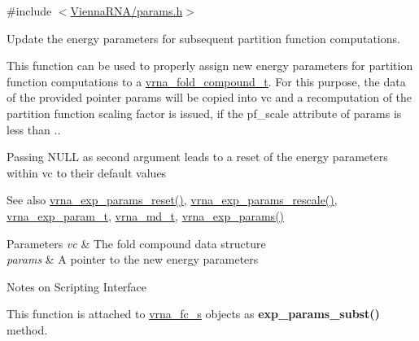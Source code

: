 {\ttfamily \#include $<$\hyperlink{params_8h}{Vienna\+R\+N\+A/params.\+h}$>$}



Update the energy parameters for subsequent partition function computations. 

This function can be used to properly assign new energy parameters for partition function computations to a \hyperlink{group__fold__compound_ga1b0cef17fd40466cef5968eaeeff6166}{vrna\+\_\+fold\+\_\+compound\+\_\+t}. For this purpose, the data of the provided pointer {\ttfamily params} will be copied into {\ttfamily vc} and a recomputation of the partition function scaling factor is issued, if the {\ttfamily pf\+\_\+scale} attribute of {\ttfamily params} is less than {.}.

Passing N\+U\+LL as second argument leads to a reset of the energy parameters within vc to their default values

\begin{DoxySeeAlso}{See also}
\hyperlink{group__energy__parameters_gaa5409218068be84d7b50c78fbdaa85a9}{vrna\+\_\+exp\+\_\+params\+\_\+reset()}, \hyperlink{group__energy__parameters_gad607bc3a5b5da16400e2ca4ea5560233}{vrna\+\_\+exp\+\_\+params\+\_\+rescale()}, \hyperlink{group__energy__parameters_ga01d8b92fe734df8d79a6169482c7d8d8}{vrna\+\_\+exp\+\_\+param\+\_\+t}, \hyperlink{group__model__details_ga1f8a10e12a0a1915f2a4eff0b28ea17c}{vrna\+\_\+md\+\_\+t}, \hyperlink{group__energy__parameters_gab1f3016f96aa96bff020cdd904605afa}{vrna\+\_\+exp\+\_\+params()}
\end{DoxySeeAlso}

\begin{DoxyParams}{Parameters}
{\em vc} & The fold compound data structure \\
\hline
{\em params} & A pointer to the new energy parameters\\
\hline
\end{DoxyParams}
\begin{DoxyRefDesc}{Notes on Scripting Interface}
\item[\hyperlink{scripting__scripting000004}{Notes on Scripting Interface}]This function is attached to \hyperlink{group__fold__compound_structvrna__fc__s}{vrna\+\_\+fc\+\_\+s} objects as {\bfseries exp\+\_\+params\+\_\+subst()} method. \end{DoxyRefDesc}
